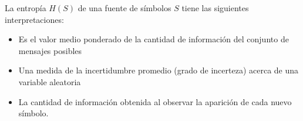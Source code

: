 La entrop\'ia $H(S)$ de una fuente de s\'imbolos $S$ tiene las siguientes interpretaciones:
\begin{itemize}
\item Es el valor medio ponderado de la cantidad de informaci\'on del conjunto de mensajes posibles
\item Una medida de la incertidumbre promedio (grado de incerteza) acerca de una variable aleatoria
\item La cantidad de informaci\'on obtenida al observar la aparici\'on de
cada nuevo s\'imbolo.
\end{itemize}
\vspace{1cm}